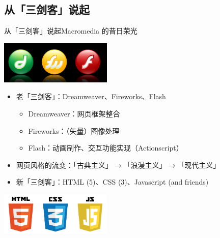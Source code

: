 \documentclass{beamer}
\begin{document}
\subsection{从「三剑客」说起}
\begin{frame}{从「三剑客」说起}{Macromedia 的昔日荣光}
\centerline{\includegraphics[width=0.4\textwidth]{pic/macromedia.png}}

\begin{itemize}
    \item 老「三剑客」：Dreamweaver、Fireworks、Flash
    \begin{itemize}
        \item Dreamweaver：网页框架整合
        \item Fireworks：（矢量）图像处理
        \item Flash：动画制作、交互功能实现（Actionscript）
    \end{itemize}
    \item 网页风格的流变：「古典主义」$\to$「浪漫主义」$\to$「现代主义」
    \item 新「三剑客」：HTML (5)、CSS (3)、Javascript (and friends)
\end{itemize}

\centerline{\includegraphics[width=0.4\textwidth]{pic/html-css-js.png}}
\end{frame}
\end{document}
